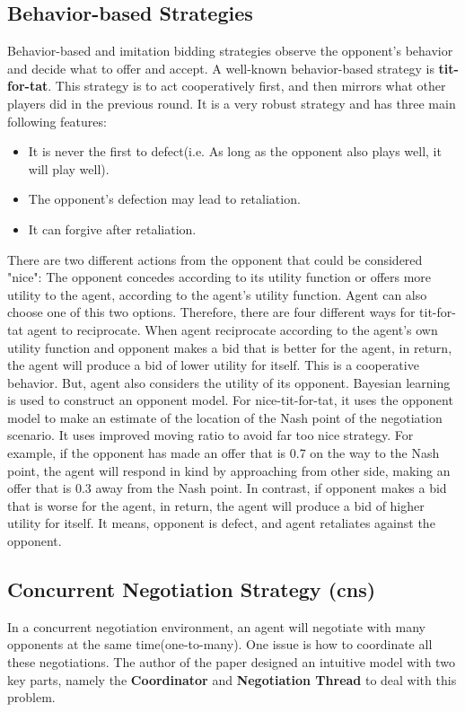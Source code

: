 \subsection{Behavior-based Strategies}
Behavior-based and imitation bidding strategies observe the opponent's behavior and decide what to offer and accept. A well-known behavior-based strategy is \textbf{tit-for-tat}. This strategy is to act cooperatively first, and then mirrors what other players did in the previous round.
It is a very robust strategy and has three main following features\parencite{Baarslag2013, chang2020multiissue}:
\begin{itemize}
\item It is never the first to defect(i.e. As long as the opponent also plays well, it will play well).
\item The opponent's defection may lead to retaliation.
\item It can forgive after retaliation.
\end{itemize}
There are two different actions from the opponent that could be considered "nice": The opponent concedes according to its utility function or offers more utility to the agent, according to the agent's utility function. Agent can also choose one of this two options. Therefore, there are four different ways for tit-for-tat agent to reciprocate. When agent reciprocate according to the agent's own utility function and opponent makes a bid that is better for the agent, in return, the agent will produce a bid of lower utility for itself. This is a cooperative behavior. But, agent also considers the utility of its opponent. Bayesian learning is used to construct an opponent model. For nice-tit-for-tat, it uses the opponent model to make an estimate of the location of the Nash point of the negotiation scenario. It uses improved moving ratio to avoid far too nice strategy. For example, if the opponent has made an offer that is 0.7 on the way to the Nash point, the agent will respond in kind by approaching from other side, making an offer that is 0.3 away from the Nash point\parencite{Baarslag2013}. In contrast, if opponent makes a bid that is worse for the agent, in return, the agent will produce a bid of higher utility for itself. It means, opponent is defect, and agent retaliates against the opponent.


\subsection{Concurrent Negotiation Strategy (\gls{cns})}
In a concurrent negotiation environment, an agent will negotiate with many opponents at the same time(one-to-many). One issue is how to coordinate all these negotiations. The author of the paper \parencite{Williams12Concurrent} designed an intuitive model with two key parts, namely the \textbf{Coordinator} and \textbf{Negotiation Thread} to deal with this problem.

